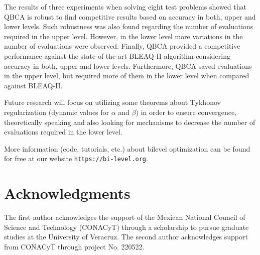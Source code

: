 \documentclass[conference]{IEEEtran}
\theoremstyle{definition}
\begin{document}
The results of three experiments when solving eight test problems showed that QBCA
is robust to find competitive results based on accuracy in both, upper and lower
levels. Such robustness was also found regarding the number of evaluations required
in the upper level. However, in the lower level more variations in the number of
evaluations were observed. Finally, QBCA provided a competitive performance against
the state-of-the-art BLEAQ-II algorithm considering accuracy in both, upper and 
lower levels. Furthermore, QBCA saved evaluations in the upper level, but required
more of them in the lower level when compared against BLEAQ-II. 

Future research will focus on utilizing some theorems about Tykhonov regularization
(dynamic values for $\alpha$ and $\beta$) in order to ensure convergence, theoretically
speaking and also looking for mechanisms to decrease the number of evaluations
required in the lower level.

More information (code, tutorials, etc.) about bilevel optimization can be found
for free at our website \verb|https://bi-level.org|.


\section*{Acknowledgments} %
The first author acknowledges the support of the Mexican National Council of Science
and Technology (CONACyT) through a scholarship to pursue graduate studies at the
University of Veracruz. The second author acknowledges support from CONACyT through
project No. 220522. 






\end{document}
